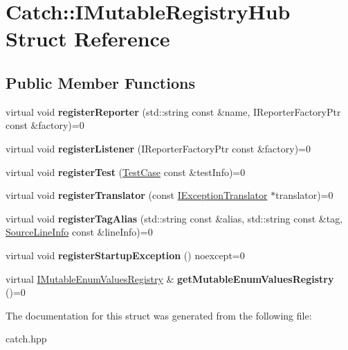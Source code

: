 \hypertarget{structCatch_1_1IMutableRegistryHub}{}\section{Catch\+:\+:I\+Mutable\+Registry\+Hub Struct Reference}
\label{structCatch_1_1IMutableRegistryHub}
\subsection*{Public Member Functions}
\begin{DoxyCompactItemize}
\item 
\mbox{\label{structCatch_1_1IMutableRegistryHub_a1c0ac202ac31ee9f88e8ff5cbac4b243}} 
virtual void {\bfseries register\+Reporter} (std\+::string const \&name, I\+Reporter\+Factory\+Ptr const \&factory)=0
\item 
\mbox{\label{structCatch_1_1IMutableRegistryHub_abd892a133f85581fd00ee75bb379ca56}} 
virtual void {\bfseries register\+Listener} (I\+Reporter\+Factory\+Ptr const \&factory)=0
\item 
\mbox{\label{structCatch_1_1IMutableRegistryHub_a11b85c6744d88c9f83fe16ad4a8dd451}} 
virtual void {\bfseries register\+Test} (\hyperlink{classCatch_1_1TestCase}{Test\+Case} const \&test\+Info)=0
\item 
\mbox{\label{structCatch_1_1IMutableRegistryHub_ae6825365102693cf7707db022a2c2b49}} 
virtual void {\bfseries register\+Translator} (const \hyperlink{structCatch_1_1IExceptionTranslator}{I\+Exception\+Translator} $\ast$translator)=0
\item 
\mbox{\label{structCatch_1_1IMutableRegistryHub_abf2e386b6f94f615719ada711adbf822}} 
virtual void {\bfseries register\+Tag\+Alias} (std\+::string const \&alias, std\+::string const \&tag, \hyperlink{structCatch_1_1SourceLineInfo}{Source\+Line\+Info} const \&line\+Info)=0
\item 
\mbox{\label{structCatch_1_1IMutableRegistryHub_a72a7d5386851ac3200f8da794a009c86}} 
virtual void {\bfseries register\+Startup\+Exception} () noexcept=0
\item 
\mbox{\label{structCatch_1_1IMutableRegistryHub_ab91c4fd63eeb0efd9bfb270e8bbd231d}} 
virtual \hyperlink{structCatch_1_1IMutableEnumValuesRegistry}{I\+Mutable\+Enum\+Values\+Registry} \& {\bfseries get\+Mutable\+Enum\+Values\+Registry} ()=0
\end{DoxyCompactItemize}


The documentation for this struct was generated from the following file\+:\begin{DoxyCompactItemize}
\item 
catch.\+hpp\end{DoxyCompactItemize}
